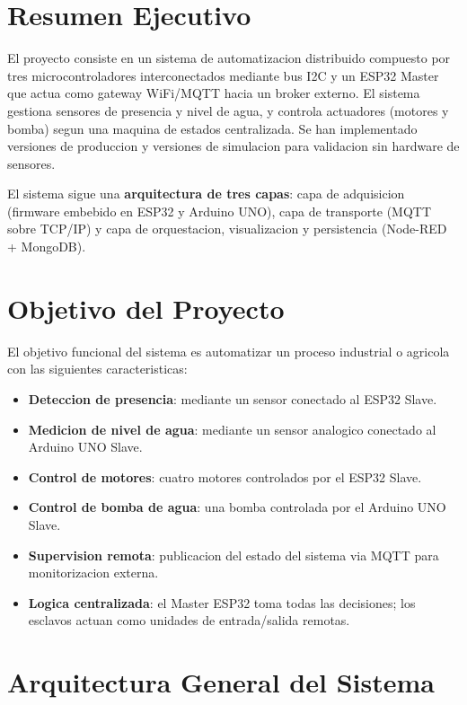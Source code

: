 \section{Resumen Ejecutivo}

El proyecto consiste en un sistema de automatizacion distribuido compuesto por tres microcontroladores interconectados mediante bus I2C y un ESP32 Master que actua como gateway WiFi/MQTT hacia un broker externo. El sistema gestiona sensores de presencia y nivel de agua, y controla actuadores (motores y bomba) segun una maquina de estados centralizada. Se han implementado versiones de produccion y versiones de simulacion para validacion sin hardware de sensores.

\begin{definicion}
El sistema sigue una \textbf{arquitectura de tres capas}: capa de adquisicion (firmware embebido en ESP32 y Arduino UNO), capa de transporte (MQTT sobre TCP/IP) y capa de orquestacion, visualizacion y persistencia (Node-RED + MongoDB).
\end{definicion}


\section{Objetivo del Proyecto}

El objetivo funcional del sistema es automatizar un proceso industrial o agricola con las siguientes caracteristicas:

\begin{itemize}
    \item \textbf{Deteccion de presencia}: mediante un sensor conectado al ESP32 Slave.
    \item \textbf{Medicion de nivel de agua}: mediante un sensor analogico conectado al Arduino UNO Slave.
    \item \textbf{Control de motores}: cuatro motores controlados por el ESP32 Slave.
    \item \textbf{Control de bomba de agua}: una bomba controlada por el Arduino UNO Slave.
    \item \textbf{Supervision remota}: publicacion del estado del sistema via MQTT para monitorizacion externa.
    \item \textbf{Logica centralizada}: el Master ESP32 toma todas las decisiones; los esclavos actuan como unidades de entrada/salida remotas.
\end{itemize}


\section{Arquitectura General del Sistema}


